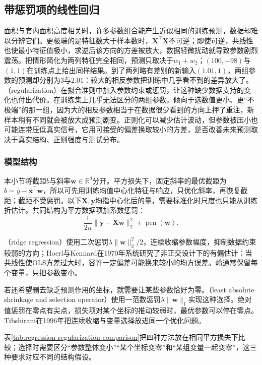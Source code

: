 \subsection{带惩罚项的线性回归}
\label{sec:regression-regularization}

面积与套内面积高度相关时，许多参数组合能产生近似相同的训练预测，数据却难以分辨它们。更极端的是特征数大于样本数时，$\bm X^{\top}\bm X$不可逆；即使可逆，共线性也使最小特征值极小，求逆后该方向的方差被放大，数据轻微扰动就导致参数剧烈震荡。把情形简化为两列特征完全相同，预测只取决于$w_1+w_2$；$(100,-98)$与$(1,1)$在训练点上给出同样结果。到了两列略有差别的新输入$(1.01,1)$，两组参数的预测却分别为$3$与$2.01$：较大的相反参数把训练中几乎看不到的差异放大了。（regularization）在拟合准则中加入参数约束或惩罚，让这种缺少数据支持的变化也付出代价。在训练集上几乎无法区分的两组参数，倾向于选数值更小、更“不极端”的那一组，因为大的相反参数相当于在数据很少看到的方向上押了重注，新样本稍有不同就会被放大成预测剧变。正则化可以减少估计波动，但参数被压小也可能连带压低真实信号，它用可接受的偏差换取较小的方差，是否改善未来预测取决于真实结构、正则强度与测试分布。

\subsubsection{模型结构}
\label{sec:regression-penalties}

本小节将截距$b$与斜率$\bm{w}\in\mathbb{R}^{d}$分开。平方损失下，固定斜率的最优截距为$b=\bar y-\bar{\bm{x}}^{\top}\bm{w}$，所以可先用训练均值中心化特征与响应，只优化斜率，再恢复截距；截距不受惩罚。以下$\bm{X},\bm{y}$均指中心化后的量，需要标准化时尺度也只能从训练折估计。共同结构为平方数据项加系数惩罚：
\[
  \frac{1}{2n}\lVert\bm{y}-\bm{X}\bm{w}\rVert_2^2+\operatorname{pen}(\bm{w}).
\]

（ridge regression）使用二次惩罚$\lambda\lVert\bm{w}\rVert_2^2/2$，连续收缩参数幅度，抑制数据约束较弱的方向；Hoerl与Kennard在1970年系统研究了非正交设计下的有偏估计：当共线性使OLS方差过大时，容许一定偏差可能换来较小的均方误差。岭通常保留每个变量，只把参数变小。

若还希望删去缺乏预测作用的坐标，就需要让某些参数恰好为零。（least absolute shrinkage and selection operator）使用一范数惩罚$\lambda\lVert\bm{w}\rVert_1$实现这种选择。绝对值惩罚在零点有尖点，损失项对某个坐标的推动较弱时，最优参数可以停在零点。Tibshirani在1996年把连续收缩与变量选择放进同一个优化问题。

表\ref{tab:regression-regularization-comparison}把四种方法放在相同平方损失下比较；选择时需要区分“参数整体变小”“某个坐标变零”和“某组变量一起变零”，这三种要求对应不同的结构假设。

